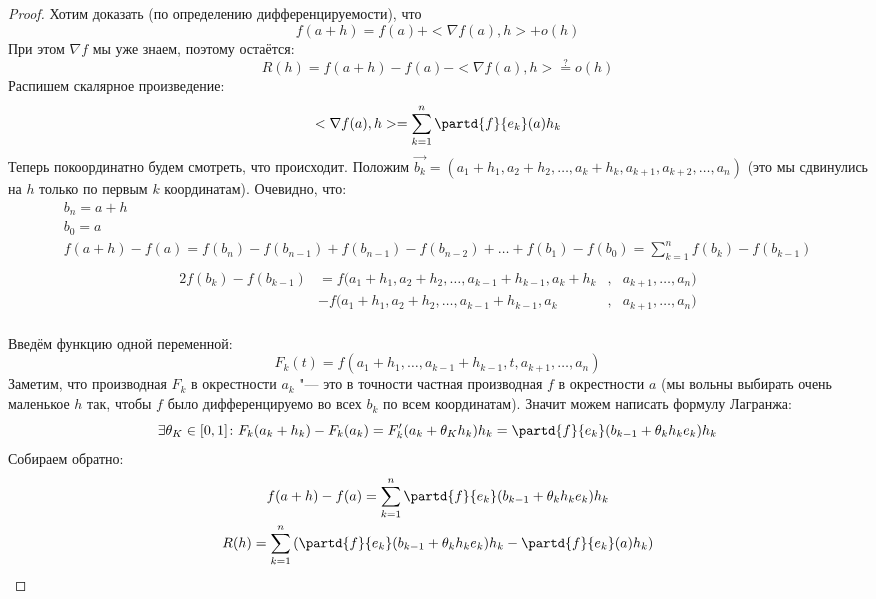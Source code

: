 

\begin{proof}
	Хотим доказать (по определению дифференцируемости), что
	\[f(a+h)=f(a)+<\nabla f(a), h>+o(h)\]
	При этом $\nabla f$ мы уже знаем, поэтому остаётся:
	\[R(h)=f(a+h)-f(a)-<\nabla f(a), h> \stackrel{?}{=} o(h)\]
	Распишем скалярное произведение:
	\[<\nabla f(a), h> = \sum_{k=1}^n \partd{f}{e_k}(a) h_k\]
	Теперь покоординатно будем смотреть, что происходит.
	Положим $\vec{b_k} = (a_1+h_1, a_2+h_2, \dots, a_k+h_k, a_{k+1}, a_{k+2}, \dots, a_n)$
	(это мы сдвинулись на $h$ только по первым $k$ координатам).
	Очевидно, что:
	\begin{gather*}
		b_n = a + h \\
		b_0 = a \\
		f(a+h)-f(a)=f(b_n)-f(b_{n-1})+f(b_{n-1})-f(b_{n-2})+\dots+f(b_1)-f(b_0)
		           =\sum_{k=1}^n f(b_k)-f(b_{k-1}) \\
	\end{gather*}
	\begin{alignat*}{2}
		f(b_k) - f(b_{k-1}) &= f(a_1+h_1, a_2+h_2, \dots, a_{k-1}+h_{k-1}, a_k+h_k&,& a_{k+1}, \dots, a_n) \\
		                    &- f(a_1+h_1, a_2+h_2, \dots, a_{k-1}+h_{k-1}, a_k    &,& a_{k+1}, \dots, a_n) \\
	\end{alignat*}

	Введём функцию одной переменной:
	\[ F_k(t) = f(a_1+h_1, \dots, a_{k-1}+h_{k-1}, t, a_{k+1}, \dots, a_n) \]
	Заметим, что производная $F_k$ в окрестности $a_k$ "--- это в точности частная производная $f$ в окрестности $a$
	(мы вольны выбирать очень маленькое $h$ так, чтобы $f$ было дифференцируемо во всех $b_k$ по всем координатам).
	Значит можем написать формулу Лагранжа:
	\[
	\exists \theta_K \in [0, 1] \colon
	F_k(a_k+h_k) - F_k(a_k) = F'_k(a_k+\theta_Kh_k)h_k
	                        = \partd{f}{e_k} (b_{k-1}+\theta_k h_k e_k) h_k
	\]
	Собираем обратно:
	\begin{gather*}
	f(a+h) - f(a) = \sum_{k=1}^n \partd{f}{e_k} (b_{k-1}+\theta_k h_k e_k) h_k \\
	R(h) = \sum_{k=1}^n \left( \partd{f}{e_k} (b_{k-1}+\theta_k h_k e_k) h_k - \partd{f}{e_k}(a) h_k \right)
	\end{gather*}


\end{proof}
